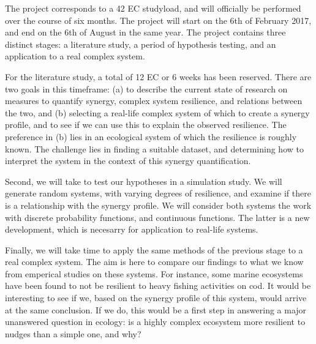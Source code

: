 \documentclass[11pt]{article}
\begin{document}
The project corresponds to a 42 EC studyload, and will officially be performed over the course of six months. 
The project will start on the 6th of February 2017, and end on the 6th of August in the same year.
The project contains three distinct stages: a literature study, a period of hypothesis testing, and an application to a real complex system. 

For the literature study, a total of 12 EC or 6 weeks has been reserved. 
There are two goals in this timeframe: (a) to describe the current state of research on measures to quantify synergy, complex system resilience, and relations between the two, and (b) selecting a real-life complex system of which to create a synergy profile, and to see if we can use this to explain the observed resilience. 
The preference in (b) lies in an ecological system of which the resilience is roughly known. 
The challenge lies in finding a suitable dataset, and determining how to interpret the system in the context of this synergy quantification.

Second, we will take to test our hypotheses in a simulation study. 
We will generate random systems, with varying degrees of resilience, and examine if there is a relationship with the synergy profile. 
We will consider both systems the work with discrete probability functions, and continuous functions. 
The latter is a new development, which is necesarry for application to real-life systems.

Finally, we will take time to apply the same methods of the previous stage to a real complex system. 
The aim is here to compare our findings to what we know from emperical studies on these systems. 
For instance, some marine ecosystems have been found to not be resilient to heavy fishing activities on cod.
It would be interesting to see if we, based on the synergy profile of this system, would arrive at the same conclusion.
If we do, this would be a first step in answering a major unanswered question in ecology: is a highly complex ecosystem more resilient to nudges than a simple one, and why?
\end{document}
